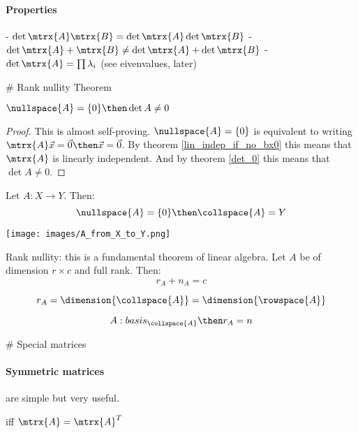 \paragraph{Properties}

    - $\det{\mtrx{A} \mtrx{B}} = \det{\mtrx{A}}\det{\mtrx{B}}$
    - $\det{\mtrx{A} + \mtrx{B}} \neq \det{\mtrx{A}} + \det{\mtrx{B}}$
    - $\det{\mtrx{A}} = \prod{\lambda_i}$ (see eivenvalues, later)










# Rank nullity Theorem


\begin{theorem}
    $ \nullspace{A} = \{ 0 \} \then \det{A} \neq 0 $
\end{theorem}
\begin{proof}
    This is almost self-proving. 
    $\nullspace{A} = \{ 0 \}$ is equivalent to writing $\mtrx{A} \vec{x} = \vec{0} \then \vec{x} = \vec{0}$.
    By theorem \ref{lin_indep_if_no_bx0} this means that $\mtrx{A}$ is linearly independent.
    And by theorem \ref{det_0} this means that $ \det{A} \neq 0 $.
\end{proof}


\begin{theorem}
    Let $A: X \to Y$. Then:
    $$ \nullspace{A} = \{ 0 \} \then \collspace{A} = Y $$
\end{theorem}

\texttt{[image: images/A\_from\_X\_to\_Y.png]}

\begin{theorem}
    Rank nullity: this is a fundamental theorem of linear algebra.
    Let $A$ be of dimension $r \times c$ and full rank.
    Then: 
    $$ r_A + n_A = c $$
\end{theorem}


\begin{theorem}
    $$ r_A = \dimension{\collspace{A}} = \dimension{\rowspace{A}} $$
\end{theorem}

\begin{theorem}
    $$ A:basis_{\collspace{A}} \then r_A = n $$
\end{theorem}






# Special matrices

\paragraph{Symmetric matrices} are simple but very useful.
\begin{definition}
     iff $\mtrx{A} = \mtrx{A}^T$
\end{definition}



